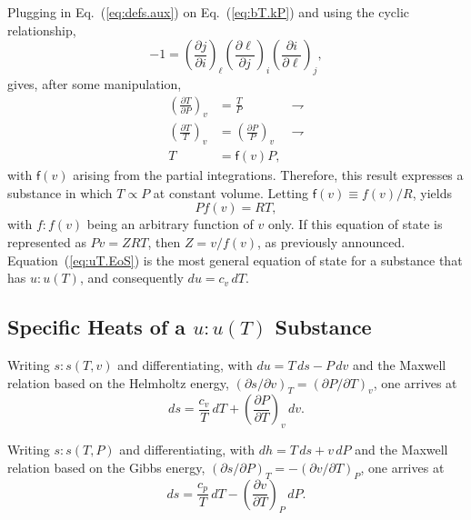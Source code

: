 \documentclass[fleqn,11pt]{SelfArx}
\newcommand{\parxyz}[3]{\left(\frac{\partial {{#1}}}{\partial {{#2}}}\right)_{\!\!\!{#3}}}
\newcommand{\inlxyz}[3]{({\partial {{#1}}}/{\partial {{#2}}})_{{#3}}}
\begin{document}
    Plugging  in  Eq.~(\ref{eq:defs.aux})  on  Eq.~(\ref{eq:bT.kP})   and   using   the   cyclic
    relationship,
    \begin{equation}
        -1 = \parxyz ji\ell \parxyz\ell ji \parxyz i\ell j,
        \label{eq:cyclic}
    \end{equation}
    \noindent gives, after some manipulation,
    \begin{align}
        \parxyz TPv & = \frac{T}{P} & \rightharpoondown \\
        \left(\frac{\partial T}{T}\right)_{\!\!\!v} & =
            \left(\frac{\partial P}{P}\right)_{\!\!\!v} & \rightharpoondown \\
        T & = \mathsf{f}(v)P,
        \label{eq:uT.TPv}
    \end{align}
    \noindent with $\mathsf{f}(v)$ arising from the partial integrations. Therefore, this result
    expresses a substance in which $T \propto P$  at  constant  volume.  Letting  $\mathsf{f}(v)
    \equiv f(v)/R$, yields
    \begin{equation}
        Pf(v) = RT,
        \label{eq:uT.EoS}
    \end{equation}
    \noindent with $f\!:\!f(v)$ being an arbitrary function of $v$ only.  If  this  equation  of
    state  is  represented  as  $Pv  =  ZRT$,  then  $Z  =  v/f(v)$,  as  previously  announced.
    Equation~(\ref{eq:uT.EoS}) is the most general equation of state for a  substance  that  has
    $u\!:\!u(T)$, and consequently $du = c_v\,dT$.

    \subsection{Specific Heats of a $u\!:\!u(T)$ Substance}

    Writing $s\!:\!s(T, v)$ and differentiating, with $du =  T\,ds  -  P\,dv$  and  the  Maxwell
    relation based on the Helmholtz energy, $\inlxyz svT = \inlxyz PTv$, one arrives at
    \begin{equation}
        ds = \frac{c_v}{T}\,dT + \parxyz PTv\,dv.
        \label{eq:ds.Tv}
    \end{equation}

    Writing $s\!:\!s(T, P)$ and differentiating, with $dh =  T\,ds  +  v\,dP$  and  the  Maxwell
    relation based on the Gibbs energy, $\inlxyz sPT = -\inlxyz vTP$, one arrives at
    \begin{equation}
        ds = \frac{c_p}{T}\,dT - \parxyz vTP\,dP.
        \label{eq:ds.TP}
    \end{equation}
\end{document}
